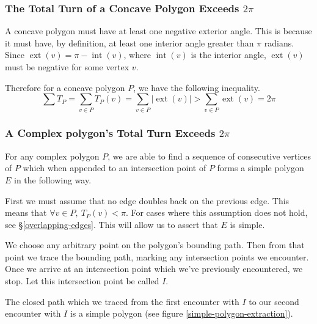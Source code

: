 \documentclass{article}
\newcommand{\inta}{\operatorname{int}} %
\newcommand{\exta}{\operatorname{ext}} %
\begin{document}
\subsubsection{The Total Turn of a Concave Polygon Exceeds \(2\pi\)} \label{concave}

A concave polygon must have at least one negative exterior angle. This is because it must have, by definition, at least one interior angle greater than \(\pi\) radians. Since \(\exta(v) = \pi - \inta(v)\), where \(\inta(v)\) is the interior angle, \(\exta(v)\) must be negative for some vertex \(v\).

Therefore for a concave polygon \(P\), we have the following inequality.
\begin{equation*}
	\sum T_P = \sum_{v \in P} T_P(v) = \sum_{v \in P} | \exta(v) | > \sum_{v \in P} \exta(v) = 2\pi
\end{equation*}

\subsubsection{A Complex polygon's Total Turn Exceeds \(2\pi\)} \label{complex}

For any complex polygon \(P\), we are able to find a sequence of consecutive vertices of \(P\) which when appended to an intersection point of \(P\) forms a simple polygon \(E\) in the following way.

First we must assume that no edge doubles back on the previous edge. This means that \(\forall v \in P,\ T_P(v) < \pi\). For cases where this assumption does not hold, see \S\ref{overlapping-edges}. This will allow us to assert that \(E\) is simple.

We choose any arbitrary point on the polygon's bounding path. Then from that point we trace the bounding path, marking any intersection points we encounter. Once we arrive at an intersection point which we've previously encountered, we stop. Let this intersection point be called \(I\).

The closed path which we traced from the first encounter with \(I\) to our second encounter with \(I\) is a simple polygon (see figure \ref{simple-polygon-extraction}).
\end{document}
